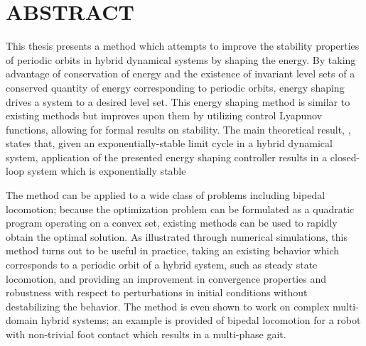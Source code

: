 %
%
%

\chapter*{ABSTRACT}

\pagestyle{plain} %
\setcounter{page}{2}

\indent This thesis presents a method which attempts to improve the stability
properties of periodic orbits in hybrid dynamical systems by shaping the
energy.
%
By taking advantage of conservation of energy and the existence of invariant
level sets of a conserved quantity of energy corresponding to periodic orbits,
energy shaping drives a system to a desired level set.
%
This energy shaping method is similar to existing methods but improves upon them
by utilizing control Lyapunov functions, allowing for formal results on
stability.
%
The main theoretical result, , states that, given
an exponentially-stable limit cycle in a hybrid dynamical system, application of
the presented energy shaping controller results in a closed-loop system which is
exponentially stable

The method can be applied to a wide class of problems including bipedal
locomotion;
%
because the optimization problem can be formulated as a quadratic program
operating on a convex set, existing methods can be used to rapidly obtain
the optimal solution.
%
As illustrated through numerical simulations, this method turns out to be useful
in practice, taking an existing behavior which corresponds to a periodic orbit
of a hybrid system, such as steady state locomotion, and providing an
improvement in convergence properties and robustness with respect to
perturbations in initial conditions without destabilizing the behavior.
%
The method is even shown to work on complex multi-domain hybrid systems;
%
an example is provided of bipedal locomotion for a robot with non-trivial foot
contact which results in a multi-phase gait.

\pagebreak{}
